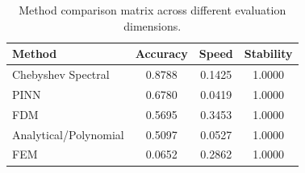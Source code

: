 \begin{table}[t]
\centering
\caption{Method comparison matrix across different evaluation dimensions.}
\label{tab:comparison_matrix}
\begin{tabular}{lccc}
\toprule
\textbf{Method} & \textbf{Accuracy} & \textbf{Speed} & \textbf{Stability} \\
\midrule
Chebyshev Spectral & 0.8788 & 0.1425 & 1.0000 \\
PINN & 0.6780 & 0.0419 & 1.0000 \\
FDM & 0.5695 & 0.3453 & 1.0000 \\
Analytical/Polynomial & 0.5097 & 0.0527 & 1.0000 \\
FEM & 0.0652 & 0.2862 & 1.0000 \\
\bottomrule
\end{tabular}
\end{table}